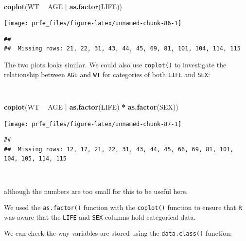 \documentclass[12pt,a4paper]{book}
\newenvironment{Shaded}{\begin{snugshade}}{\end{snugshade}}
\newcommand{\KeywordTok}[1]{\textcolor[rgb]{0.13,0.29,0.53}{\textbf{#1}}}
\newcommand{\NormalTok}[1]{#1}
\newcommand{\OperatorTok}[1]{\textcolor[rgb]{0.81,0.36,0.00}{\textbf{#1}}}
\newcommand{\StringTok}[1]{\textcolor[rgb]{0.31,0.60,0.02}{#1}}
\theoremstyle{definition}
\theoremstyle{definition}
\theoremstyle{definition}
\theoremstyle{remark}
\begin{document}
~

\begin{Shaded}
\begin{Highlighting}[]
\KeywordTok{coplot}\NormalTok{(WT }\OperatorTok{~}\StringTok{ }\NormalTok{AGE }\OperatorTok{|}\StringTok{ }\KeywordTok{as.factor}\NormalTok{(LIFE))}
\end{Highlighting}
\end{Shaded}

\begin{center}\texttt{[image: prfe\_files/figure-latex/unnamed-chunk-86-1]} \end{center}

\begin{verbatim}
## 
##  Missing rows: 21, 22, 31, 43, 44, 45, 69, 81, 101, 104, 114, 115
\end{verbatim}

\newpage

The two plots looks similar. We could also use \texttt{coplot()} to
investigate the relationship between \texttt{AGE} and \texttt{WT} for
categories of both \texttt{LIFE} and \texttt{SEX}:

~

\begin{Shaded}
\begin{Highlighting}[]
\KeywordTok{coplot}\NormalTok{(WT }\OperatorTok{~}\StringTok{ }\NormalTok{AGE }\OperatorTok{|}\StringTok{ }\KeywordTok{as.factor}\NormalTok{(LIFE) }\OperatorTok{*}\StringTok{ }\KeywordTok{as.factor}\NormalTok{(SEX))}
\end{Highlighting}
\end{Shaded}

\begin{center}\texttt{[image: prfe\_files/figure-latex/unnamed-chunk-87-1]} \end{center}

\begin{verbatim}
## 
##  Missing rows: 12, 17, 21, 22, 31, 43, 44, 45, 66, 69, 81, 101, 104, 105, 114, 115
\end{verbatim}

~

although the numbers are too small for this to be useful here.

We used the \texttt{as.factor()} function with the \texttt{coplot()}
function to ensure that \texttt{R} was aware that the \texttt{LIFE} and
\texttt{SEX} columns hold categorical data.

We can check the way variables are stored using the
\texttt{data.class()} function:
\end{document}
